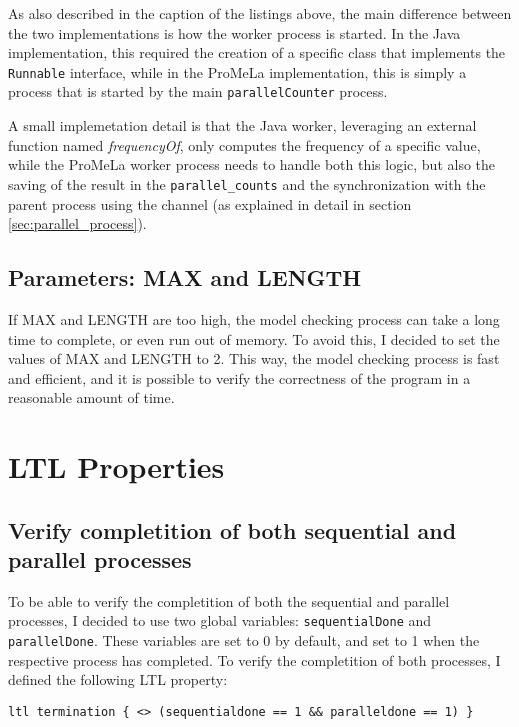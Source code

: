 \documentclass[a4paper, 11pt]{article}
\begin{document}
As also described in the caption of the listings above, the main difference between the two implementations is how the worker process is started. In the Java implementation, this required the creation of a specific class that implements the \texttt{Runnable} interface, while in the ProMeLa implementation, this is simply a process that is started by the main \texttt{parallelCounter} process.

A small implemetation detail is that the Java worker, leveraging an external function named \textit{frequencyOf}, only computes the frequency of a specific value, while the ProMeLa worker process needs to handle both this logic, but also the saving of the result in the \texttt{parallel\_counts} and the synchronization with the parent process using the channel (as explained in detail in section \ref{sec:parallel_process}).

\subsection{Parameters: MAX and LENGTH}

If MAX and LENGTH are too high, the model checking process can take a long time to complete, or even run out of memory. To avoid this, I decided to set the values of MAX and LENGTH to 2. This way, the model checking process is fast and efficient, and it is possible to verify the correctness of the program in a reasonable amount of time.

\pagebreak

\section{LTL Properties}

\subsection{Verify completition of both sequential and parallel processes}

To be able to verify the completition of both the sequential and parallel processes, I decided to use two global variables: \texttt{sequentialDone} and \texttt{parallelDone}. These variables are set to 0 by default, and set to 1 when the respective process has completed. To verify the completition of both processes, I defined the following LTL property:

\begin{lstlisting}[language=Promela, caption={LTL properties to verify the completition of both sequential and parallel processes}, captionpos=b, breaklines=true]
ltl termination { <> (sequentialdone == 1 && paralleldone == 1) }
\end{lstlisting}
\end{document}
